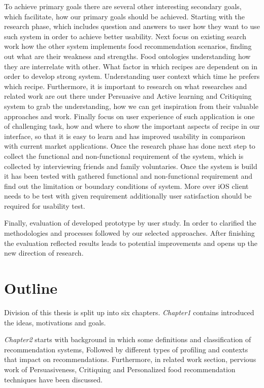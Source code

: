 To achieve primary goals there are several other interesting secondary goals, which facilitate, how our primary goals should be achieved. Starting with the research phase, which includes question and answers to user how they want to use such system in order to achieve better usability. Next focus on existing search work how the other system implements food recommendation scenarios, finding out what are their weakness and strengths. Food ontologies understanding how they are interrelate with other. What factor in which recipes are dependent on in order to develop strong system. Understanding user context which time he prefers which recipe. Furthermore, it is important to research on what researches and related work are out there under Persuasive and Active learning and Critiquing system to grab the understanding, how we can get inspiration from their valuable approaches and work. Finally focus on user experience of such application is one of challenging task, how and where to show the important aspects of recipe in our interface, so that it is easy to learn and has improved usability in comparison with current market applications.\newline
Once the research phase has done next step to collect the functional and non-functional requirement of the system, which is collected by interviewing friends and family voluntaries. Once the system is build it has been tested with gathered functional and non-functional requirement and find out the limitation or boundary conditions of system. More over iOS client needs to be test with given requirement additionally user satisfaction should be required for usability test.\newline

Finally, evaluation of developed prototype by user study. In order to clarified the methodologies and processes followed by our selected approaches. After finishing the evaluation reflected results leads to potential improvements and opens up the new direction of research.\newline

\section{Outline}

Division of this thesis is split up into six chapters. \textit{Chapter1} contains introduced the ideas, motivations and goals.\newline

\textit{Chapter2} starts with background in which some definitions and classification of recommendation systems, Followed by different types of profiling and contexts that impact on recommendations. Furthermore, in related work section, pervious work of Persuasiveness, Critiquing and Personalized food recommendation techniques have been discussed.\newline

